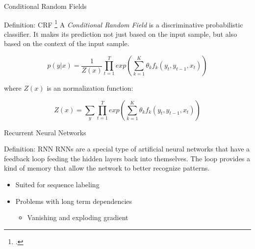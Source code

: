 \documentclass[12pt, tikz]{beamer}
\begin{document}
\begin{frame}[fragile]{Conditional Random Fields}
	\begin{block}{Definition: CRF \footcite{lafferty2001conditional}}
	A \textit{Conditional Random Field} is a discriminative probabilistic classifier. It makes its prediction not just based on the input sample, but also based on the context of the input sample.
	\end{block}
	\pause
	\vspace{-0.35cm}
	\begin{equation}
	p(y|x) = \frac{1}{Z(x)} \prod_{t=1}^T exp(\sum_{k=1}^{K} \theta_k f_k(y_t, y_{t-1}, x_t))
	\end{equation}

	where $Z(x)$ is an normalization function:

	\begin{equation}
	Z(x) = \sum_{y} \prod_{t=1}^{T} exp(\sum_{k=1}^{K} \theta_k f_k(y_t, y_{t-1}, x_t))
	\end{equation}
\end{frame}

\begin{frame}[fragile]{Recurrent Neural Networks}
	
	\begin{block}{Definition: RNN}
		RNNs are a special type of artificial neural networks that have a feedback loop feeding the hidden layers back into themselves. The loop provides a kind of memory that allow the network to better recognize patterns.
	\end{block}
	\pause
	\begin{itemize}
		\item<2-> Suited for sequence labeling
		\item<3-> Problems with long term dependencies
		\begin{itemize}
			\item Vanishing and exploding gradient
		\end{itemize}
	\end{itemize}
\end{frame}
\end{document}

